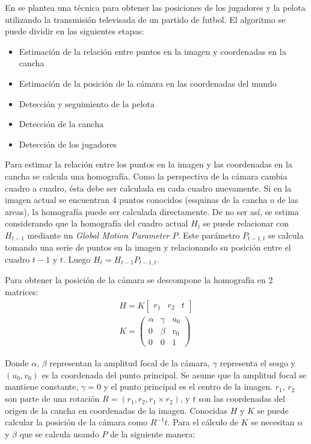 \documentclass[a4paper,10pt]{article}
\begin{document}
En \cite{LIU20061146} se plantea una técnica para obtener las posiciones de los
jugadores y la pelota utilizando la transmisión televisada de un partido de
futbol. El algoritmo se puede dividir en las siguientes etapas:

\begin{itemize}
  \item Estimación de la relación entre puntos en la imagen y coordenadas en la cancha
  \item Estimación de la posición de la cámara en las coordenadas del mundo
  \item Detección y seguimiento de la pelota
  \item Detección de la cancha
  \item Detección de los jugadores
\end{itemize}

Para estimar la relación entre los puntos en la imagen y las coordenadas en la cancha se calcula una homografía.
Como la perspectiva de la cámara cambia cuadro a cuadro, ésta debe ser calculada en cada cuadro nuevamente.
Si en la imagen actual se encuentran 4 puntos conocidos (esquinas de la cancha o de las areas), la homografía puede ser calculada directamente.
De no ser así, se estima considerando que la homografía del cuadro actual $H_t$ se puede
relacionar con $H_{t-1}$ mediante un \textit{Global Motion Parameter} $P$.
Este parámetro $P_{t-1,t}$ se calcula tomando una serie de puntos en la imagen y relacionando su posición entre el cuadro $t-1$ y $t$.
Luego $ H_t = H_{t-1} P_{t-1,t}$.

Para obtener la posición de la cámara se descompone la homografía en 2 matrices:
\begin{eqnarray*}
H = K \begin{bmatrix} r_1 & r_2 & t \end{bmatrix} \\
K = \begin{pmatrix}
    \alpha & \gamma & u_0 \\
    0 & \beta & v_0 \\
    0 & 0 & 1
    \end{pmatrix}
\end{eqnarray*}

Donde $\alpha$, $\beta$ representan la amplitud focal de la cámara, $\gamma$ representa el sesgo y $(u_0, v_0)$ es la coordenada del punto principal.
Se asume que la amplitud focal se mantiene constante, $\gamma = 0$ y el punto principal es el centro de la imagen.
$r_1$, $r_2$ son parte de una rotación $R = (r_1, r_2, r_1 \times r_2)$, y $t$ son las coordenadas del origen de la cancha en coordenadas de la imagen.
Conocidas $H$ y $K$ se puede calcular la posición de la cámara como $R^{-1} t$.
Para el cálculo de $K$ se necesitan $\alpha$ y $\beta$ que se calcula usando $P$ de la siguiente manera:
\end{document}

